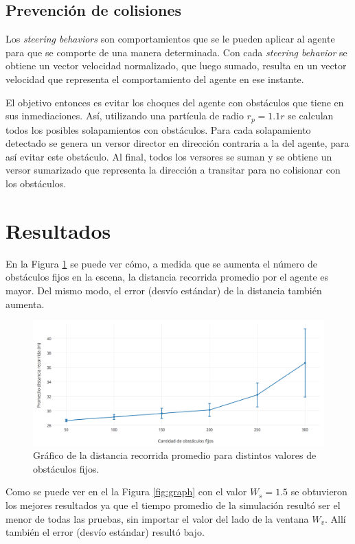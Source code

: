 \documentclass[a4paper,10pt]{article}
\begin{document}
\subsection{Prevención de colisiones}

Los \textit{steering behaviors} son comportamientos que se le pueden aplicar al agente para que se comporte de una manera determinada. Con cada \textit{steering behavior} se obtiene un vector velocidad normalizado, que luego sumado, resulta en un vector velocidad que representa el comportamiento del agente en ese instante.

El objetivo entonces es evitar los choques del agente con obstáculos que tiene en sus inmediaciones. Así, utilizando una partícula de radio $r_{p} = 1.1 r$ se calculan todos los posibles solapamientos con obstáculos. Para cada solapamiento detectado se genera un versor director en dirección contraria a la del agente, para así evitar este obstáculo. Al final, todos los versores se suman y se obtiene un versor sumarizado que representa la dirección a transitar para no colisionar con los obstáculos.

\section{Resultados}

En la Figura \ref{fig:graph2} se puede ver cómo, a medida que se aumenta el número de obstáculos fijos en la escena, la distancia recorrida promedio por el agente es mayor. Del mismo modo, el error (desvío estándar) de la distancia también aumenta. 

\begin{figure}[H]
	\centering
    \includegraphics[width=\textwidth]{charts/graph2.png}
    \caption{Gráfico de la distancia recorrida promedio para distintos valores de obstáculos fijos.}
    \label{fig:graph2}
\end{figure}

Como se puede ver en el la Figura \ref{fig:graph} con el valor $W_{s} = 1.5$ se obtuvieron los mejores resultados ya que el tiempo promedio de la simulación resultó ser el menor de todas las pruebas, sin importar el valor del lado de la ventana $W_{v}$. Allí también el error (desvío estándar) resultó bajo.
\end{document}
